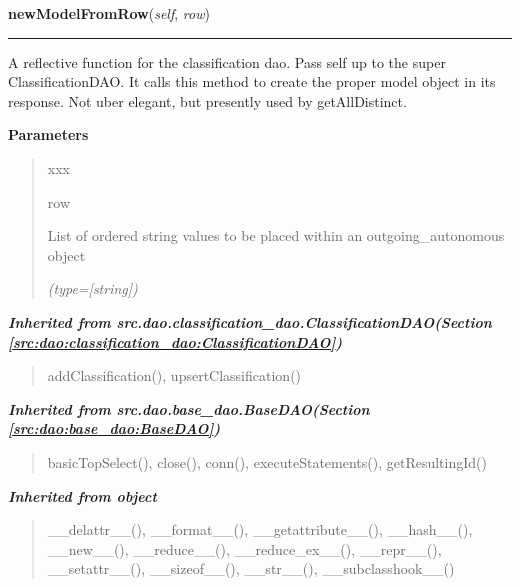 \hspace{.8\funcindent}\begin{boxedminipage}{\funcwidth}

    \raggedright \textbf{newModelFromRow}(\textit{self}, \textit{row})

    \vspace{-1.5ex}

    \rule{\textwidth}{0.5\fboxrule}
\setlength{\parskip}{2ex}
    A reflective function for the classification dao. Pass self up to the 
    super ClassificationDAO. It calls this method to create the proper 
    model object in its response. Not uber elegant, but presently used by 
    getAllDistinct.

\setlength{\parskip}{1ex}
      \textbf{Parameters}
      \vspace{-1ex}

      \begin{quote}
        \begin{Ventry}{xxx}

          \item[row]

          List of ordered string values to be placed within an 
          outgoing\_autonomous object

            {\it (type=[string])}

        \end{Ventry}

      \end{quote}

    \end{boxedminipage}


\large{\textbf{\textit{Inherited from src.dao.classification\_dao.ClassificationDAO\textit{(Section \ref{src:dao:classification_dao:ClassificationDAO})}}}}

\begin{quote}
addClassification(), upsertClassification()
\end{quote}

\large{\textbf{\textit{Inherited from src.dao.base\_dao.BaseDAO\textit{(Section \ref{src:dao:base_dao:BaseDAO})}}}}

\begin{quote}
basicTopSelect(), close(), conn(), executeStatements(), getResultingId()
\end{quote}

\large{\textbf{\textit{Inherited from object}}}

\begin{quote}
\_\_delattr\_\_(), \_\_format\_\_(), \_\_getattribute\_\_(), \_\_hash\_\_(), \_\_new\_\_(), \_\_reduce\_\_(), \_\_reduce\_ex\_\_(), \_\_repr\_\_(), \_\_setattr\_\_(), \_\_sizeof\_\_(), \_\_str\_\_(), \_\_subclasshook\_\_()
\end{quote}

